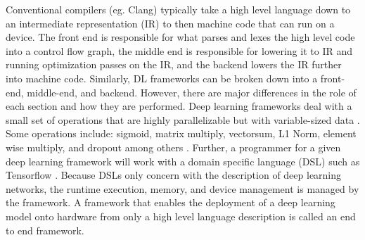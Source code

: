 Conventional compilers (eg. Clang) typically take a high level language down to
an intermediate representation (IR) to then machine code that can run on a
device.  The front end is responsible for what parses and lexes the high level
code into a control flow graph, the middle end is responsible for lowering it
to IR and running optimization passes on the IR, and the backend lowers the IR
further into machine code. Similarly, DL frameworks can be broken down into a
front-end, middle-end, and backend. However, there are major differences in the
role of each section and how they are performed.  Deep learning frameworks
deal with a small set of operations that are highly parallelizable but with
variable-sized data \cite{nGraph}. Some operations include: sigmoid, matrix
multiply, vectorsum, L1 Norm, element wise multiply, and dropout among others
\cite{cntk}. Further, a programmer for a given deep learning framework will
work with a domain specific language (DSL) such as Tensorflow
\cite{tensorflow}. Because DSLs only concern with the description of deep
learning networks, the runtime execution, memory, and device management is
managed by the framework. A framework that enables the deployment of a deep
learning model onto hardware from only a high level language description is
called an end to end framework.




